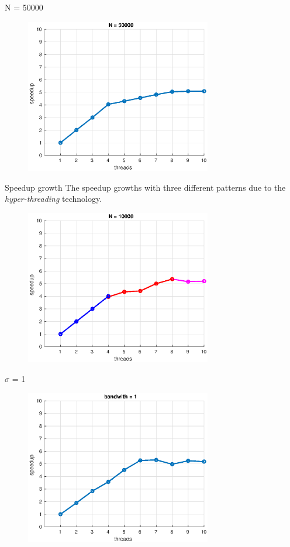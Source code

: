 \documentclass{beamer}
\begin{document}
\begin{frame}{N = 50000}

\begin{figure}[H]
\centering
\includegraphics[width=3.2in]{../Paper/fig/speedup50000.eps}
\end{figure}

\end{frame}


\begin{frame}{Speedup growth}
The speedup growths with three different patterns due to the \textit{hyper-threading} technology.

\begin{figure}[H]
\centering
\includegraphics[width=3.2in]{../Paper/fig/speedup10000Colors.eps}
\end{figure}
\end{frame}


\begin{frame}{$\sigma$ = 1}

\begin{figure}[H]
\centering
\includegraphics[width=3.2in]{../Paper/fig/speedup1b.eps}
\end{figure}

\end{frame}
\end{document}
